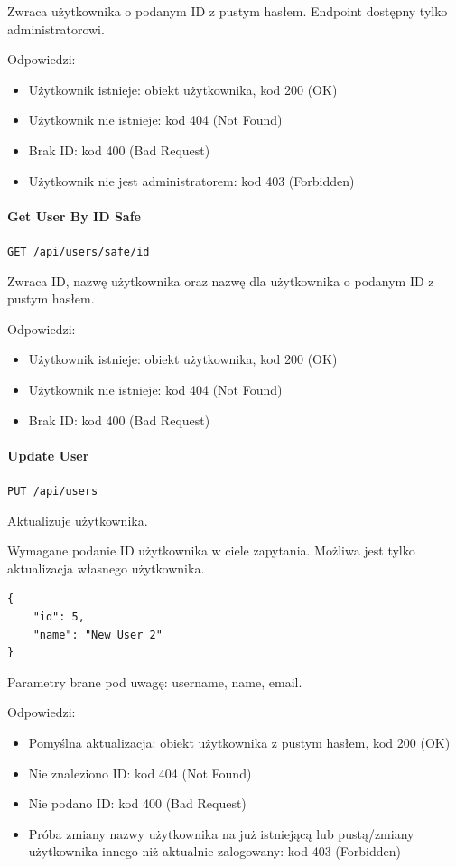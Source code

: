 \documentclass[a4paper,twoside,12pt]{book}
\begin{document}
Zwraca użytkownika o podanym ID z pustym hasłem. Endpoint dostępny tylko administratorowi.

Odpowiedzi: 
\begin{itemize}
	\item Użytkownik istnieje: obiekt użytkownika, kod 200 (OK)
	\item Użytkownik nie istnieje: kod 404 (Not Found) 
	\item Brak ID: kod 400 (Bad Request) 
	\item Użytkownik nie jest administratorem: kod 403 (Forbidden)
\end{itemize}

\paragraph{Get User By ID Safe}

\texttt{GET /api/users/safe/{id}}

Zwraca ID, nazwę użytkownika oraz nazwę dla użytkownika o podanym ID z pustym hasłem.

Odpowiedzi: 
\begin{itemize}
	\item Użytkownik istnieje: obiekt użytkownika, kod 200 (OK)
	\item Użytkownik nie istnieje: kod 404 (Not Found) 
	\item Brak ID: kod 400 (Bad Request) 
\end{itemize}

\paragraph{Update User}

\texttt{PUT /api/users}

Aktualizuje użytkownika.

Wymagane podanie ID użytkownika w ciele zapytania. Możliwa jest tylko aktualizacja własnego użytkownika.

\begin{verbatim}
{
    "id": 5,
    "name": "New User 2"
}
\end{verbatim}

Parametry brane pod uwagę: username, name, email.

Odpowiedzi: 
\begin{itemize}
	\item Pomyślna aktualizacja: obiekt użytkownika z pustym hasłem, kod 200 (OK) 
	\item Nie znaleziono ID: kod 404 (Not Found) 
	\item Nie podano ID: kod 400 (Bad Request)
	\item Próba zmiany nazwy użytkownika na już istniejącą lub pustą/zmiany użytkownika innego niż aktualnie zalogowany: kod 403 (Forbidden)
\end{itemize}
\end{document}
